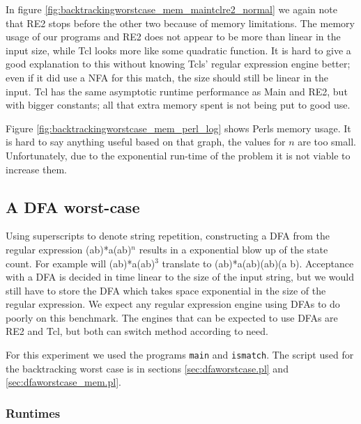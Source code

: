 In figure \vref{fig:backtrackingworstcase_mem_maintclre2_normal} we
again note that RE2 stops before the other two because of memory limitations. The memory usage of our programs and RE2 does not appear
to be more than linear in the input size, while Tcl looks more like some
quadratic function. It is hard to give a good explanation to this
without knowing Tcls' regular expression engine better; even if it did use a
NFA for this match, the size should still be linear in the input. Tcl
has the same asymptotic runtime performance as Main and RE2, but with
bigger constants; all that extra memory spent is not being put to
good use. 

Figure \vref{fig:backtrackingworstcase_mem_perl_log} shows Perls
memory usage. It is hard to say anything useful based on that graph,
the values for $n$ are too small. Unfortunately, due to the
exponential run-time of the problem it is not viable to increase them.

\subsection{A DFA worst-case}

Using superscripts to denote string repetition, constructing a DFA
from the regular expression \textsf{(a\textbar b)*a(a\textbar b)$^n$}
results in a exponential blow up of the state count. For example will
\textsf{(a\textbar b)*a(a\textbar b)$^3$} translate to
\textsf{(a\textbar b)*a(a\textbar b)(a\textbar b)(a\textbar
  b)}. Acceptance with a DFA is decided in time linear to the size of
the input string, but we would still have to store the DFA which takes
space exponential in the size of the regular expression. We expect any
regular expression engine using DFAs to do poorly on this
benchmark. The engines that can be expected to use DFAs are RE2 and
Tcl, but both can switch method according to need. 


For this experiment we used the programs \texttt{main} and
\texttt{ismatch}. The script used for the backtracking worst case is
in sections \vref{sec:dfaworstcase.pl} and
\vref{sec:dfaworstcase_mem.pl}.


\subsubsection*{Runtimes}

